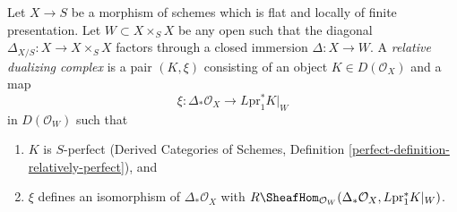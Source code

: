 \begin{definition}
\label{definition-relative-dualizing-complex}
Let $X \to S$ be a morphism of schemes which is flat and
locally of finite presentation. Let $W \subset X \times_S X$
be any open such that the diagonal $\Delta_{X/S} : X \to X \times_S X$
factors through a closed immersion $\Delta : X \to W$.
A {\it relative dualizing complex} is a
pair $(K, \xi)$ consisting of an object $K \in D(\mathcal{O}_X)$
and a map
$$
\xi : \Delta_*\mathcal{O}_X \longrightarrow L\text{pr}_1^*K|_W
$$
in $D(\mathcal{O}_W)$ such that
\begin{enumerate}
\item $K$ is $S$-perfect (Derived Categories of Schemes, Definition
\ref{perfect-definition-relatively-perfect}), and
\item $\xi$ defines an isomorphism of $\Delta_*\mathcal{O}_X$
with
$R\SheafHom_{\mathcal{O}_W}(
\Delta_*\mathcal{O}_X, L\text{pr}_1^*K|_W)$.
\end{enumerate}
\end{definition}